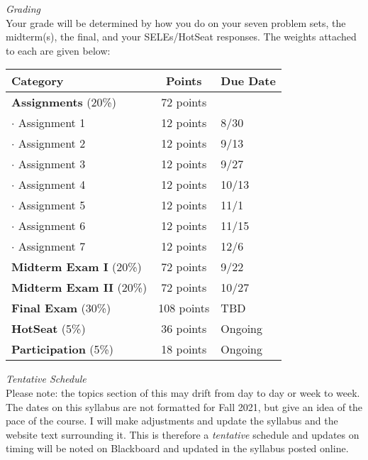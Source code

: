 \documentclass[a4paper]{article}
\begin{document}
\emph{Grading}\\
Your grade will be determined by how you do on your seven problem sets, the midterm(s), the final, and your SELEs/HotSeat responses.  The weights attached to each are given below:\\
\begin{table}[ht!]
\centering
\begin{tabular}{lcl}
Category & Points & Due Date \\
\hline
\textbf{Assignments} (20\%) & 72 points & \\
$\cdot$ Assignment 1 & 12 points & 8/30\\
$\cdot$ Assignment 2 & 12 points & 9/13\\
$\cdot$ Assignment 3 & 12 points & 9/27\\
$\cdot$ Assignment 4 & 12 points & 10/13\\
$\cdot$ Assignment 5 & 12 points & 11/1\\
$\cdot$ Assignment 6 & 12 points & 11/15\\
$\cdot$ Assignment 7 & 12 points & 12/6\\
\hline
\textbf{Midterm Exam I } (20\%) & 72 points & 9/22\\
\hline
\textbf{Midterm Exam II} (20\%) & 72 points & 10/27\\
\hline
\textbf{Final Exam} (30\%) & 108 points & TBD\\
\hline
\textbf{HotSeat} (5\%) & 36 points & Ongoing\\
\hline
\textbf{Participation} (5\%) & 18 points & Ongoing\\
\end{tabular}
\end{table}


\clearpage
\emph{Tentative Schedule}\\
Please note: the topics section of this may drift from day to day or week to week.  The dates on this syllabus are not formatted for Fall 2021, but give an idea of the pace of the course.  I will make adjustments and update the syllabus and the website text surrounding it.  This is therefore a \emph{tentative} schedule and updates on timing will be noted on Blackboard and updated in the syllabus posted online.\\
\end{document}
